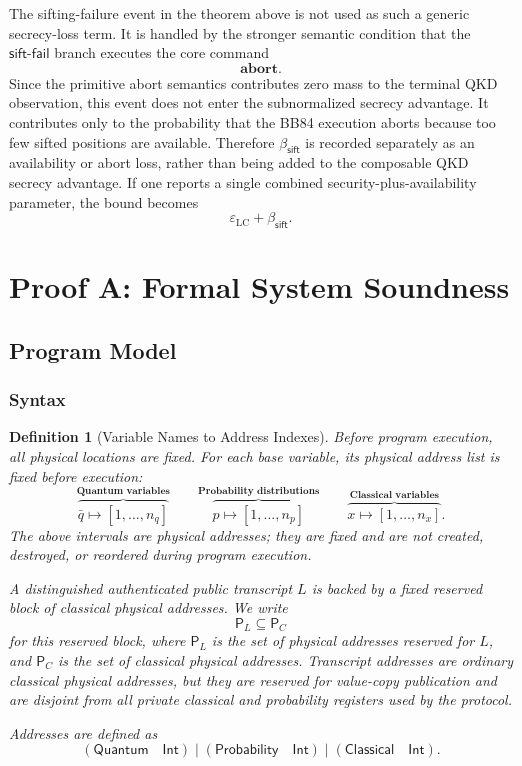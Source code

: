 \documentclass[acmsmall,screen,review,anonymous,nonacm]{acmart}
\newtheorem{definition}{Definition}[section]
\theoremstyle{defn_style}
\begin{document}
The sifting-failure event in the theorem above is not used as such a generic
secrecy-loss term.  It is handled by the stronger semantic condition that the
\(\mathsf{sift\mbox{-}fail}\) branch executes the core command
\[
\mathbf{abort}.
\]
Since the primitive abort semantics contributes zero mass to the terminal QKD
observation, this event does not enter the subnormalized secrecy advantage.  It
contributes only to the probability that the BB84 execution aborts because too
few sifted positions are available.  Therefore
\(\beta_{\mathsf{sift}}\) is recorded separately as an availability or abort
loss, rather than being added to the composable QKD secrecy advantage.  If one
reports a single combined security-plus-availability parameter, the bound
becomes
\[
\varepsilon_{\mathrm{LC}}+\beta_{\mathsf{sift}}.
\]

\newpage
\section{Proof A: Formal System Soundness}

\subsection{Program Model}
\subsubsection{Syntax}

\begin{definition}[Variable Names to Address Indexes]
Before program execution, all physical locations are fixed. For each base
variable, its physical address list is fixed before execution:
\[
\overset{\textbf{Quantum variables}}{\overbrace{
\bar q \mapsto [1,\ldots,n_q]
}}
\qquad
\overset{\textbf{Probability distributions}}{\overbrace{
p \mapsto [1,\ldots,n_p]
}}
\qquad
\overset{\textbf{Classical variables}}{\overbrace{
x \mapsto [1,\ldots,n_x]
}} .
\]
The above intervals are physical addresses; they are fixed and are not
created, destroyed, or reordered during program execution.

A distinguished authenticated public transcript \(L\) is backed by a fixed
reserved block of classical physical addresses. We write
\[
\mathsf P_L\subseteq \mathsf P_C
\]
for this reserved block, where \(\mathsf P_L\) is the set of physical
addresses reserved for \(L\), and \(\mathsf P_C\) is the set of classical
physical addresses. Transcript addresses are ordinary classical physical
addresses, but they are reserved for value-copy publication and are disjoint
from all private classical and probability registers used by the protocol.


Addresses are defined as
\[
(\mathsf{Quantum}\quad \mathsf{Int})
\mid
(\mathsf{Probability}\quad \mathsf{Int})
\mid
(\mathsf{Classical}\quad \mathsf{Int}) .
\]
\end{definition}
\end{document}

